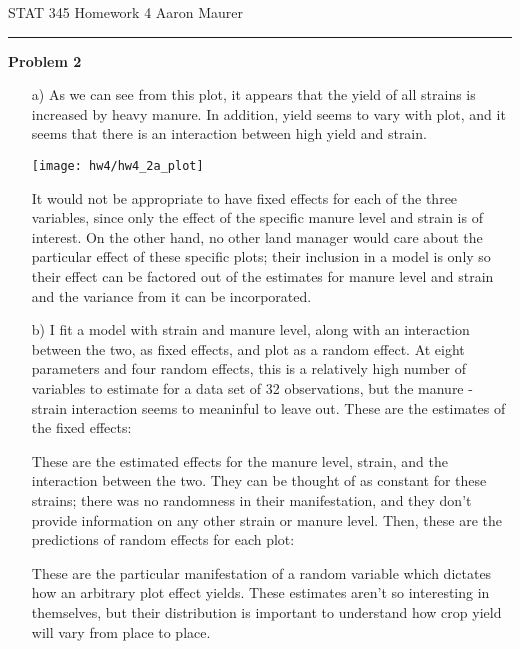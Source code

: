 \documentclass[11pt]{article}
\theoremstyle{definition}
\begin{document}
\newpage
STAT 345 Homework 4 \hfill Aaron Maurer
\vspace{2mm}
\hrule
\vspace{2mm}
{\bf Problem 2}
\begin{itemize}
    \item[a)]
        As we can see from this plot, it appears that the yield of all strains is increased by heavy manure. In addition, yield seems to vary with plot, and it seems that there is an interaction between high yield and strain.
        \begin{center}
            \texttt{[image: hw4/hw4\_2a\_plot]}
        \end{center}
        It would not be appropriate to have fixed effects for each of the three variables, since only the effect of the specific manure level and strain is of interest. On the other hand, no other land manager would care about the particular effect of these specific plots; their inclusion in a model is only so their effect can be factored out of the estimates for manure level and strain and the variance from it can be incorporated.
    \item[b)]
        I fit a model with strain and manure level, along with an interaction between the two, as fixed effects, and plot as a random effect. At eight parameters and four random effects, this is a relatively high number of variables to estimate for a data set of 32 observations, but the manure - strain interaction seems to meaninful to leave out. These are the estimates of the fixed effects: \\
            \FloatBarrier
             
            \FloatBarrier
            These are the estimated effects for the manure level, strain, and the interaction between the two. They can be thought of as constant for these strains; there was no randomness in their manifestation, and they don't provide information on any other strain or manure level. Then, these are the predictions of random effects for each plot:
            \FloatBarrier
             
            \FloatBarrier
            These are the particular manifestation of a random variable which dictates how an arbitrary plot effect yields. These estimates aren't so interesting in themselves, but their distribution is important to understand how crop yield will vary from place to place.


\end{itemize}
\end{document}
